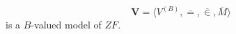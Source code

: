 $$\mathbf{V} = \langle V^{(B)}, \overline{=}, \overline{\in}, \overline{M} \rangle$$
is a $B$-valued model of $ZF$.